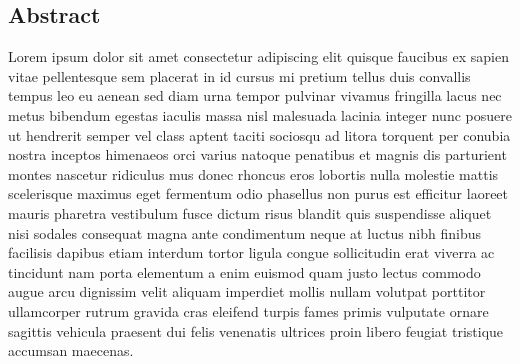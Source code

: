 \begin{adjustwidth}{0.5cm}{0.5cm}
    \section*{\normalsize Abstract}
    \vspace{-0.3cm}
    \normalsize
    Lorem ipsum dolor sit amet consectetur adipiscing elit quisque faucibus ex sapien vitae pellentesque sem placerat in id cursus mi pretium tellus duis convallis tempus leo eu aenean sed diam urna tempor pulvinar vivamus fringilla lacus nec metus bibendum egestas iaculis massa nisl malesuada lacinia integer nunc posuere ut hendrerit semper vel class aptent taciti sociosqu ad litora torquent per conubia nostra inceptos himenaeos orci varius natoque penatibus et magnis dis parturient montes nascetur ridiculus mus donec rhoncus eros lobortis nulla molestie mattis scelerisque maximus eget fermentum odio phasellus non purus est efficitur laoreet mauris pharetra vestibulum fusce dictum risus blandit quis suspendisse aliquet nisi sodales consequat magna ante condimentum neque at luctus nibh finibus facilisis dapibus etiam interdum tortor ligula congue sollicitudin erat viverra ac tincidunt nam porta elementum a enim euismod quam justo lectus commodo augue arcu dignissim velit aliquam imperdiet mollis nullam volutpat porttitor ullamcorper rutrum gravida cras eleifend turpis fames primis vulputate ornare sagittis vehicula praesent dui felis venenatis ultrices proin libero feugiat tristique accumsan maecenas.
\end{adjustwidth}